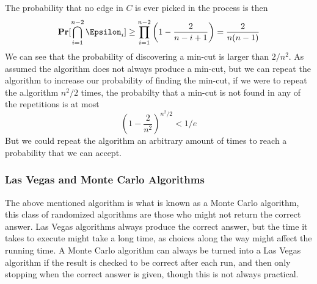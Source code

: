 \documentclass[a4paper]{article}
\def\Pr{\mbox{\textbf{Pr}}}
\begin{document}
The probability that no edge in $C$ is ever picked in the process is then
$$
\Pr[\bigcap_{i=1}^{n-2}\Epsilon_i] \geq \prod_{i=1}^{n-2} \left( 1 - \frac{2}{n-i+1}\right) = \frac{2}{n(n-1)}
$$
We can see that the probability of discovering a min-cut is larger than $2/n^2$. As assumed the algorithm does not always produce a min-cut, but we can repeat the algorithm to increase our probability of finding the min-cut, if we were to repeat the a.lgorithm $n^2/2$ times, the probabilty that a min-cut is not found in any of the repetitions is at most
$$
\left(1-\frac{2}{n^2}\right)^{n^2/2} < 1/e
$$
But we could repeat the algorithm an arbitrary amount of times to reach a probability that we can accept.

\subsubsection{Las Vegas and Monte Carlo Algorithms}
The above mentioned algorithm is what is known as a Monte Carlo algorithm, this class of randomized algorithms are those who might not return the correct answer. Las Vegas algorithms always produce the correct answer, but the time it takes to execute might take a long time, as choices along the way might affect the running time. A Monte Carlo algorithm can always be turned into a Las Vegas algorithm if the result is checked to be correct after each run, and then only stopping when the correct answer is given, though this is not always practical.
\end{document}
